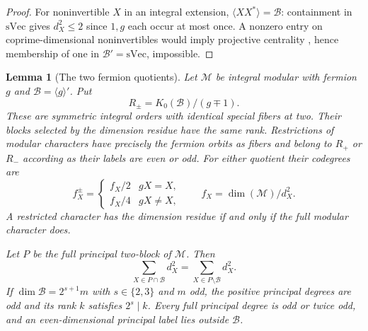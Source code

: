 \documentclass[11pt,a4paper]{article}
\numberwithin{equation}{section}
\newtheorem{lemma}[theorem]{Lemma}
\theoremstyle{remark}
\newcommand{\M}{\mathcal M}
\newcommand{\K}{K_0}
\newcommand{\sVec}{\mathrm{sVec}}
\begin{document}
\begin{proof}
For noninvertible $X$ in an integral extension,
$\langle XX^*\rangle=\mathcal B$: containment in $\sVec$ gives
$d_X^2\le2$ since $1,g$ each occur at most once.
A nonzero entry on coprime-dimensional noninvertibles would imply
projective centrality \cite[Proposition~8.22.5 and Lemma~9.15.1]{EGNO}, hence membership of
one in $\mathcal B'=\sVec$, impossible.
\end{proof}

\begin{lemma}[The two fermion quotients]\label{fam:M:4.5}
\label{lem:fermion-quotients}
Let $\M$ be integral modular with fermion $g$ and
$\mathcal B=\langle g\rangle'$. Put
\[
 R_\pm=\K(\mathcal B)/(g\mp1).
\]
These are symmetric integral orders with identical special fibers
at two. Their blocks selected by the dimension residue have the same
rank. Restrictions of modular characters have precisely the
fermion orbits as fibers and belong to $R_+$ or $R_-$ according
as their labels are even or odd. For either quotient their codegrees are
\begin{equation}\label{eq:fermion-restriction-codegree}
 f_X^\pm=
 \begin{cases}f_X/2&gX=X,\\ f_X/4&gX\ne X,\end{cases}
 \qquad f_X=\dim(\M)/d_X^2.
\end{equation}
A restricted character has the dimension residue if and only if
the full modular character does.

Let $P$ be the full principal two-block of $\M$. Then
\begin{equation}\label{eq:principal-fermion-masses}
 \sum_{X\in P\cap\mathcal B}d_X^2
 =\sum_{X\in P\setminus\mathcal B}d_X^2.
\end{equation}
If $\dim\mathcal B=2^{s+1}m$ with $s\in\{2,3\}$ and $m$ odd,
the positive principal degrees are odd and its rank $k$ satisfies
$2^s\mid k$. Every full principal degree is odd or twice odd,
and an even-dimensional principal label lies outside $\mathcal B$.
\end{lemma}
\end{document}
